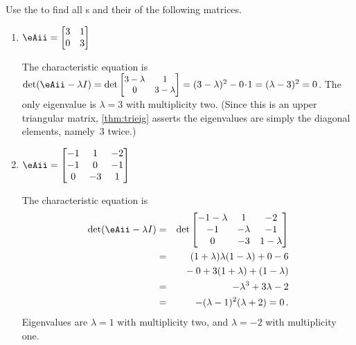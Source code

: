 \begin{example} \label{eg:faem}
Use the  to find all s and their  of the following matrices.
\begin{enumerate}
\item\label{eg:faem:a} \(\eAii=\begin{bmatrix} 3&1\\0&3 \end{bmatrix}\)
\begin{solution}The characteristic equation is \(\det(\eAii-\lambda I)
=\det{\small\begin{bmatrix} 3-\lambda&1\\0&3-\lambda \end{bmatrix}}
=(3-\lambda)^2-0\cdot1=(\lambda-3)^2=0\). 
The only eigenvalue is \(\lambda=3\) with multiplicity two.
(Since this is an upper triangular matrix, \autoref{thm:trieig} asserts the eigenvalues are simply the diagonal elements, namely~\(3\) twice.)
\end{solution}

\item\label{eg:faem:b} \(\eAii=\begin{bmatrix}-1&1&-2
\\-1&0&-1
\\0&-3&1 \end{bmatrix}\)
\begin{solution}The characteristic equation is 
\begin{eqnarray*}
\det(\eAii-\lambda I)
&=&\det\begin{bmatrix}-1-\lambda&1&-2
\\-1&-\lambda&-1
\\0&-3&1-\lambda\end{bmatrix}
\\&=&(1+\lambda)\lambda(1-\lambda)+0-6
\\&&{}
-0+3(1+\lambda)+(1-\lambda)
\\&=&-\lambda^3+3\lambda-2
\\&=&-(\lambda-1)^2(\lambda+2)=0\,.
\end{eqnarray*}
Eigenvalues are \(\lambda=1\) with multiplicity two, and \(\lambda=-2\) with multiplicity one.
\end{solution}



\end{enumerate}
\end{example}

